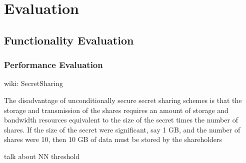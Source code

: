 \chapter{Evaluation}

\section{Functionality Evaluation}

\subsection{Performance Evaluation}

wiki: SecretSharing

The disadvantage of unconditionally secure secret sharing schemes is that the storage and transmission of the shares requires an amount of storage and bandwidth resources equivalent to the size of the secret times the number of shares. If the size of the secret were significant, say 1 GB, and the number of shares were 10, then 10 GB of data must be stored by the shareholders

talk about NN threshold
